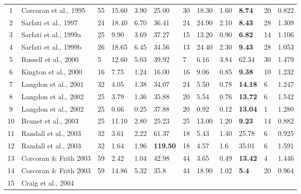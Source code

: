 \documentclass[a4paper, 12pt, twoside]{article}
\begin{document}
\begin{landscape}
\begin{longtable}[l]{cL{4cm} R{1.5cm}  R{1.5cm} R{1.5cm}R{1.5cm}  R{1.5cm}  R{1.5cm} R{1.5cm}R{1.5cm} R{1.5cm}R{1.5cm}}
		1 & Corcoran et al., 1995 
		& 55 & 15.60 & 3.90 & 25.00 & 30 & 18.30 & 1.60 & \textbf{8.74} & 20 & 0.822 \\       
		2 & Sarfati et al., 1997 
		& 24 & 18.40 & 6.70 & 36.41 & 24 & 24.90 & 2.10 & \textbf{8.43} & 28 & 1.309\\        
		3 & Sarfati et al., 1999a 
		& 25 & 9.90 & 3.69 & 37.27 & 15 & 13.20 & 0.90 & \textbf{6.82} & 14 & 1.106\\       
		4 & Sarfati et al., 1999b 
		& 26 & 18.65 & 6.45 & 34.56 & 13 & 24.40 & 2.30 & \textbf{9.43} & 28 & 1.053\\
		5 & Russell et al., 2000  
		& 5 & 12.60 & 5.03 & 39.92 & 7 & 6.16 & 3.84 & 62.34 & 30 & 1.479 \\       
		6 & Kington et al., 2000 
		& 16 & 7.75 & 1.24 & 16.00 & 16 & 9.06 & 0.85 & \textbf{9.38} & 10 & 1.232 \\      
		7 & Langdon et al., 2001 
		& 32 & 4.05 & 1.38 & 34.07 & 24 & 5.50 & 0.78 & \textbf{14.18} & 6 & 1.247\\       
		8 & Langdon et al., 2002 
		& 25 & 3.79 & 1.36 & 35.88 & 20 & 5.54 & 0.76 & \textbf{13.72} & 6 & 1.542\\       
		9 & Langdon et al., 2002 
		& 25 & 0.66 & 0.25 & 37.88 & 20 & 0.92 & 0.12 & \textbf{13.04} & 1 &1.280 \\      
		10& Brunet et al., 2003 
		& 25 & 11.10 & 2.80 & 25.23 & 25 & 13.00 & 1.20 & \textbf{9.23} & 14 & 0.882 \\    
		11 & Randall et al., 2003 
		& 32 & 3.61 & 2.22 & 61.37 & 18 & 5.43 & 1.40 & 25.78 & 6 & 0.925 \\      
		12 & Randall et al., 2003 
		& 32 & 1.64 & 1.96 & \textbf{119.50} & 18 & 4.57 & 1.6 & 35.01 & 6 & 1.591\\      
		13 & Corcoran \& Frith 2003 
		& 59 & 2.42 & 1.04 & 42.98 & 44 & 3.65 & 0.49 & \textbf{13.42} & 4 & 1.446\\      
		14 & Corcoran \& Frith 2003 
		& 59 & 14.86 & 5.32 & 35.8 & 44 & 18.90 & 1.02 & \textbf{5.4} & 20 & 0.964\\    
		15 & Craig et al., 2004 

\end{longtable}
\end{landscape}
\end{document}
